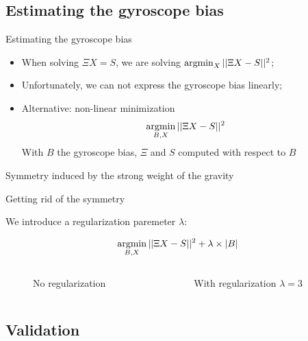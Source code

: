\documentclass{beamer}
\newcommand{\argmin}{\operatornamewithlimits{argmin}}
\begin{document}
\subsection{Estimating the gyroscope bias}
\begin{frame}{Estimating the gyroscope bias}

  \begin{itemize}[<+->]
  \item When solving  $\Xi X = S$, we are solving $\argmin_X ||\Xi X - S||^2$;
  \item Unfortunately, we can not express the gyroscope bias linearly;
  \item Alternative: non-linear minimization
  \[
  \argmin_{B,X} ||\Xi X - S||^2
  \]
  {\tiny With $B$ the gyroscope bias, $\Xi$ and $S$ computed with respect to $B$}
  \end{itemize}

  \begin{figure}[h!]
        \centering
        \resizebox{0.47\textwidth}{!}{}
  \end{figure}

  Symmetry induced by the strong weight of the gravity
\end{frame}

\begin{frame}{Getting rid of the symmetry}

  We introduce a regularization paremeter $\lambda$:

  \[
  \argmin_{B,X} ||\Xi X - S||^2 + \lambda \times |B|
  \]

  \begin{columns}
    \begin{figure}[h!]
      \centering
      \resizebox{\textwidth}{!}{}
      \caption{No regularization}
    \end{figure}~

    \begin{figure}[h!]
      \centering
      \resizebox{\textwidth}{!}{}
      \caption{With regularization $\lambda =3$}
    \end{figure}
  \end{columns}

\end{frame}

\subsection{Validation}
\end{document}
